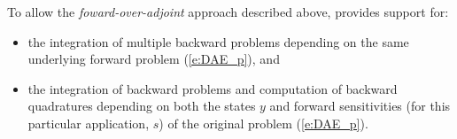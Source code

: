 \bigskip

To allow the {\em foward-over-adjoint} approach described above, {\idas} provides support for:
\begin{itemize}
\item the integration of multiple backward problems depending on the same
  underlying forward problem (\ref{e:DAE_p}), and
\item the integration of backward problems and computation of backward quadratures
  depending on both the states $y$ and forward sensitivities (for this particular
  application, $s$) of the original problem (\ref{e:DAE_p}).
\end{itemize}
